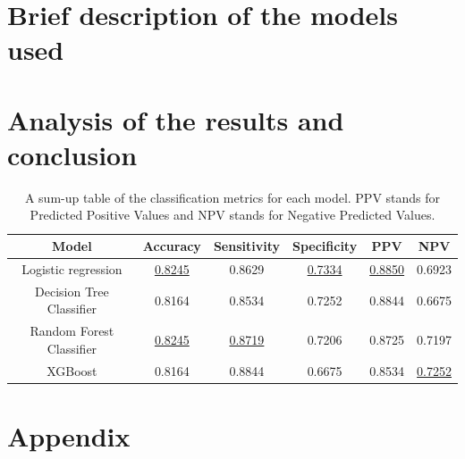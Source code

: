 \documentclass[a4paper,11pt, titlepage]{article}
\begin{document}

\section{Brief description of the models used} \label{models}



\section{Analysis of the results and conclusion} \label{results}
\begin{table}[h!]
    \begin{tabular}[t]{|c|ccccc|}
        \rowcolor{orange!30}
\hline
\textbf{Model} & \textbf{Accuracy} & \textbf{Sensitivity} & \textbf{Specificity} & \textbf{PPV} & \textbf{NPV} \\
\hline
Logistic regression         & \underline{0.8245} & 0.8629 & \underline{0.7334} & \underline{0.8850} & 0.6923 \\
Decision Tree Classifier    & 0.8164          & 0.8534 & 0.7252 & 0.8844 & 0.6675 \\
Random Forest Classifier    & \underline{0.8245} & \underline{0.8719} & 0.7206 & 0.8725 & 0.7197 \\
XGBoost                     & 0.8164          & 0.8844 & 0.6675 & 0.8534 & \underline{0.7252} \\
\hline
    \end{tabular}
\centering
\caption{A sum-up table of the classification metrics for each model. PPV stands for Predicted Positive Values and NPV stands for Negative Predicted Values.}
\label{metrics}
\end{table}%

\appendix


\section{Appendix}

\end{document}
